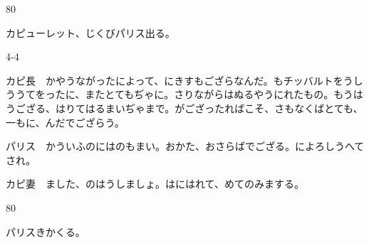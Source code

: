 \documentclass[tate,paper=b6j,jafontsize=9pt]{jlreq}
\begin{document}

\begin{azconvIndented}{8\zw}{0\zw}

カピューレット、じくびパリス出る。

\end{azconvIndented}
\begin{azconvIndented}{4\zw}{-4\zw}

カピ長　かやうながったによって、にきすもござらなんだ。もチッバルトをうしううてをったに、またとてもぢゃに。さりながらはぬるやうにれたもの。もうはうござる、はりてはるまいぢゃまで。がござったればこそ、さもなくばとても、一もに、んだでござらう。

パリス　かういふのにはのもまい。おかた、おさらばでござる。によろしうへてされ。

カピ妻　ました、のはうしましょ。はにはれて、めてのみまする。

\end{azconvIndented}
\begin{azconvIndented}{8\zw}{0\zw}

パリスきかくる。

\end{azconvIndented}
\end{document}
